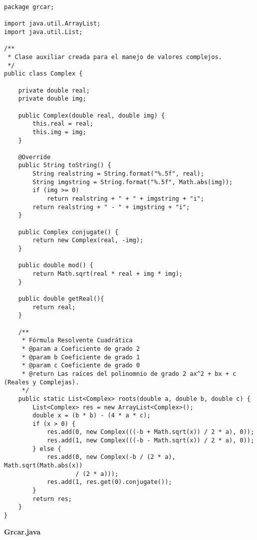 \documentclass[a4paper,10pt]{article}
\begin{document}
\begin{verbatim}
package grcar;

import java.util.ArrayList;
import java.util.List;

/**
 * Clase auxiliar creada para el manejo de valores complejos.
 */
public class Complex {

	private double real;
	private double img;

	public Complex(double real, double img) {
		this.real = real;
		this.img = img;
	}

	@Override
	public String toString() {
		String realstring = String.format("%.5f", real);
		String imgstring = String.format("%.5f", Math.abs(img));
		if (img >= 0)
			return realstring + " + " + imgstring + "i";
		return realstring + " - " + imgstring + "i";
	}

	public Complex conjugate() {
		return new Complex(real, -img);
	}

	public double mod() {
		return Math.sqrt(real * real + img * img);
	}
	
	public double getReal(){
		return real;
	}
	
	/**
	 * Fórmula Resolvente Cuadrática
	 * @param a Coeficiente de grado 2
	 * @param b	Coeficiente de grado 1
	 * @param c Coeficiente de grado 0
	 * @return Las raíces del polinomnio de grado 2 ax^2 + bx + c (Reales y Complejas).
	 */
	public static List<Complex> roots(double a, double b, double c) {
		List<Complex> res = new ArrayList<Complex>();
		double x = (b * b) - (4 * a * c);
		if (x > 0) {
			res.add(0, new Complex(((-b + Math.sqrt(x)) / 2 * a), 0));
			res.add(1, new Complex(((-b - Math.sqrt(x)) / 2 * a), 0));
		} else {
			res.add(0, new Complex(-b / (2 * a), Math.sqrt(Math.abs(x))
					/ (2 * a)));
			res.add(1, res.get(0).conjugate());
		}
		return res;
	}
}

\end{verbatim}

\begin{center}
\textbf{Grcar.java}
\end{center}
\end{document}
